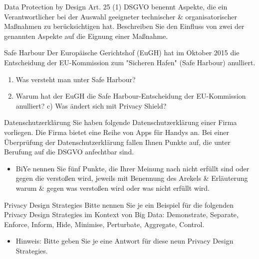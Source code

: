 \documentclass{exercisesheet}
\begin{document}
\begin{exercise*}{Data Protection by Design}
  Art. 25 (1) DSGVO benennt Aspekte, die ein Verantwortlicher bei der Auswahl geeigneter technischer \& organisatorischer Maßnahmen zu berücksichtigen hat. Beschreiben Sie den Einfluss von zwei der genannten Aspekte auf die Eignung einer Maßnahme.
\end{exercise*}

\begin{exercise*}{Safe Harbour}
  Der Europäische Gerichtshof (EuGH) hat im Oktober 2015 die Entscheidung der EU-Kommission zum "Sicheren Hafen" (Safe Harbour) anulliert.
  \begin{enumerate}
    \item Was versteht man unter Safe Harbour?
    \item Warum hat der EuGH die Safe Harbour-Entscheidung der EU-Kommission anulliert? c) Was ändert sich mit Privacy Shield?
  \end{enumerate}
\end{exercise*}

\begin{exercise*}{Datenschutzerklärung}
  Sie haben folgende Datenschutzerklärung einer Firma vorliegen. Die Firma bietet eine Reihe von Apps für Handys an. Bei einer Überprüfung der Datenschutzerklärung fallen Ihnen Punkte auf, die unter Berufung auf die DSGVO anfechtbar sind.
  \begin{itemize}
    \item BiYe nennen Sie fünf Punkte, die Ihrer Meinung nach nicht erfüllt sind oder gegen die verstoßen wird, jeweils mit Benennung des Arekels \& Erläuterung warum \& gegen was verstoßen wird oder was nicht erfüllt wird.
  \end{itemize}
\end{exercise*}

\begin{exercise*}{Privacy Design Strategies}
  Bitte nennen Sie je ein Beispiel für die folgenden Privacy Design Strategies im Kontext von Big Data: Demonstrate, Separate, Enforce, Inform, Hide, Minimise, Perturbate, Aggregate, Control.
  \begin{itemize}
    \item Hinweis: Bitte geben Sie je eine Antwort für diese neun Privacy Design Strategies.
  \end{itemize}
\end{exercise*}
\end{document}
